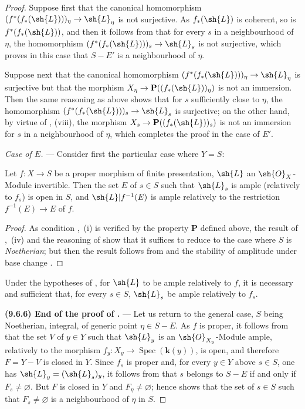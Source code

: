 \begin{proof}
Suppose first that the canonical homomorphism $(f^*(f_*(\sh{L})))_\eta\to\sh{L}_\eta$ is not surjective.
As $f_*(\sh{L})$ is coherent, so is $f^*(f_*(\sh{L}))$, and then it follows from  that for every $s$ in a neighbourhood of $\eta$, the homomorphism $(f^*(f_*(\sh{L})))_s\to\sh{L}_s$ is not surjective, which proves in this case that $S-E'$ is a neighbourhood of $\eta$.

Suppose next that the canonical homomorphism $(f^*(f_*(\sh{L})))_\eta\to\sh{L}_\eta$ is surjective but that the morphism $X_\eta\to\mathbf{P}((f_*(\sh{L}))_\eta)$ is not an immersion.
Then the same reasoning as above shows that for $s$ sufficiently close to $\eta$, the homomorphism $(f^*(f_*(\sh{L})))_s\to\sh{L}_s$ is surjective; on the other hand, by virtue of , (viii), the morphism $X_s\to\mathbf{P}((f_*(\sh{L}))_s)$ is not an immersion for $s$ in a neighbourhood of $\eta$, which completes the proof in the case of $E'$.

\emph{Case of $E$.} --- Consider first the particular case where $Y=S$:

\begin{corollary}[9.6.4]
\label{IV.9.6.4}
Let $f:X\to S$ be a proper morphism of finite presentation, $\sh{L}$ an $\sh{O}_X$-Module invertible.
Then the set $E$ of $s\in S$ such that $\sh{L}_s$ is ample (relatively to $f_s$) is open in $S$, and $\sh{L}|f^{-1}(E)$ is ample relatively to the restriction $f^{-1}(E)\to E$ of $f$.
\end{corollary}

\begin{proof}
As condition ,~(i) is verified by the property $\mathbf{P}$ defined above, the result of ,~(iv) and the reasoning of  show that it suffices to reduce to the case where $S$ is \emph{Noetherian}; but then the result follows from  and the stability of amplitude under base change .
\end{proof}

\begin{corollary}[9.6.5]
\label{IV.9.6.5}
Under the hypotheses of , for $\sh{L}$ to be ample relatively to $f$, it is necessary and sufficient that, for every $s\in S$, $\sh{L}_s$ be ample relatively to $f_s$.
\end{corollary}

\label{IV.9.6.6}%
\textbf{(9.6.6) End of the proof of .} ---
Let us return to the general case, $S$ being Noetherian, integral, of generic point $\eta\in S-E$.
As $f$ is proper, it follows from  that the set $V$ of $y\in Y$ such that $\sh{L}_y$ is an $\sh{O}_{X_y}$-Module ample, relatively to the morphism $f_y:X_y\to\operatorname{Spec}(\boldsymbol{k}(y))$, is open, and therefore $F=Y-V$ is closed in $Y$.
Since $f_s$ is proper and, for every $y\in Y$ above $s\in S$, one has
$\sh{L}_y=(\sh{L}_s)_y$, it follows from  that $s$ belongs to
$S-E$ if and only if $F_s\neq\varnothing$.
But $F$ is closed in $Y$ and $F_\eta\neq\varnothing$; hence  shows
that the set of $s\in S$ such that $F_s\neq\varnothing$ is a neighbourhood of
$\eta$ in $S$.
\end{proof}

